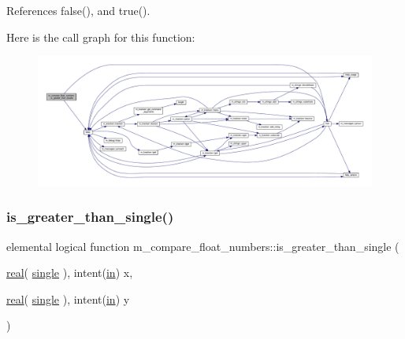 References false(), and true().

Here is the call graph for this function\+:
\nopagebreak
\begin{figure}[H]
\begin{center}
\leavevmode
\includegraphics[width=350pt]{namespacem__compare__float__numbers_ac0b7c9aeec5a785ebff7a6e59ba5fb26_cgraph}
\end{center}
\end{figure}
\mbox{\label{namespacem__compare__float__numbers_ab525ef9c044e5187643e04c64d470186}} 
\subsubsection{\texorpdfstring{is\+\_\+greater\+\_\+than\+\_\+single()}{is\_greater\_than\_single()}}
{\footnotesize\ttfamily elemental logical function m\+\_\+compare\+\_\+float\+\_\+numbers\+::is\+\_\+greater\+\_\+than\+\_\+single (\begin{DoxyParamCaption}\item[{\hyperlink{read__watch_83_8txt_abdb62bde002f38ef75f810d3a905a823}{real}( \hyperlink{namespacem__compare__float__numbers_a5f122d46d6ad7d1cf0b899d9c855c498}{single} ), intent(\hyperlink{M__journal_83_8txt_afce72651d1eed785a2132bee863b2f38}{in})}]{x,  }\item[{\hyperlink{read__watch_83_8txt_abdb62bde002f38ef75f810d3a905a823}{real}( \hyperlink{namespacem__compare__float__numbers_a5f122d46d6ad7d1cf0b899d9c855c498}{single} ), intent(\hyperlink{M__journal_83_8txt_afce72651d1eed785a2132bee863b2f38}{in})}]{y }\end{DoxyParamCaption})\hspace{0.3cm}{\ttfamily [private]}}



